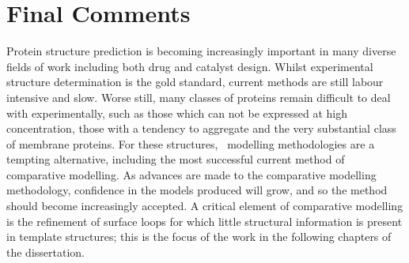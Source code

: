 \section{Final Comments}

Protein structure prediction is becoming increasingly important in many diverse
fields of work including both drug and catalyst design. Whilst experimental structure determination is the gold standard, current methods are still labour intensive and slow. Worse still, many classes of proteins remain difficult
to deal with experimentally, such as those which can not be expressed at high concentration, those with a tendency to aggregate and the very substantial class of membrane proteins. For these structures, \insilico\ modelling methodologies
are a tempting alternative, including the most successful current method of
comparative modelling. As advances are made to  the comparative
modelling methodology, confidence in the models produced will grow, and so the
method should become increasingly accepted. A critical element of comparative modelling is the refinement of surface loops for which little structural information is present in template structures; this is the focus of the work in the following chapters of the dissertation.

